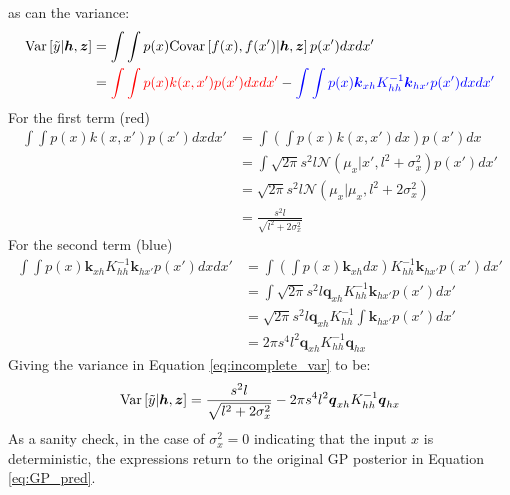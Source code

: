 \documentclass{article}
\begin{document}
as can the variance:
\begin{equation}
    \begin{aligned}
        \text{Var}\left[\Tilde{y}|\boldsymbol{h},\boldsymbol{z}\right]&=\int\int p(x)\text{Covar}\left[f(x),f(x')|\boldsymbol{h},\boldsymbol{z}\right]p(x')dxdx' \\
        &=\textcolor{red}{\int\int p(x)k(x,x')p(x')dxdx'}
        -\textcolor{blue}{\int\int p(x)\boldsymbol{k}_{xh}K_{hh}^{-1}\boldsymbol{k}_{hx'}p(x')dxdx'}
    \label{eq:incomplete_var}
    \end{aligned}
\end{equation}
For the first term (red)
\begin{equation}
    \begin{aligned}
        \int\int p(x)k(x,x')p(x')dxdx'&=\int\left(\int p(x)k(x,x')dx\right)p(x')dx \\
        &=\int \sqrt{2\pi}s^2l\mathcal{N}(\mu_x|x',l^2 + \sigma_x^2)p(x')dx' \\
        &=\sqrt{2\pi}s^2l\mathcal{N}(\mu_x|\mu_x,l^2+2\sigma_x^2) \\
        &=\frac{s^2l}{\sqrt{l^2+2\sigma_x^2}}
    \end{aligned}
\end{equation}
For the second term (blue)
\begin{equation}
    \begin{aligned}
        \int\int p(x)\boldsymbol{k}_{xh}K_{hh}^{-1}\boldsymbol{k}_{hx'}p(x')dxdx'
        &=\int\left(\int p(x)\boldsymbol{k}_{xh}dx\right)K_{hh}^{-1}\boldsymbol{k}_{hx'}p(x')dx' \\
        &=\int \sqrt{2\pi}s^2l\boldsymbol{q}_{xh}K_{hh}^{-1}\boldsymbol{k}_{hx'}p(x')dx' \\
        &=\sqrt{2\pi}s^2l\boldsymbol{q}_{xh}K_{hh}^{-1} \int \boldsymbol{k}_{hx'}p(x')dx' \\
        &=2\pi s^4 l^2 \boldsymbol{q}_{xh}K_{hh}^{-1}\boldsymbol{q}_{hx}
    \end{aligned}
\end{equation}
Giving the variance in Equation \ref{eq:incomplete_var} to be:
\begin{equation}
    \text{Var}\left[\Tilde{y}|\boldsymbol{h},\boldsymbol{z}\right]=\frac{s^2l}{\sqrt{l^2+2\sigma_x^2}} - 2\pi s^4 l^2 \boldsymbol{q}_{xh}K_{hh}^{-1}\boldsymbol{q}_{hx}
\end{equation}
As a sanity check, in the case of $\sigma_x^2=0$ indicating that the input $x$ is deterministic, the expressions return to the original GP posterior in Equation \ref{eq:GP_pred}.
\end{document}
